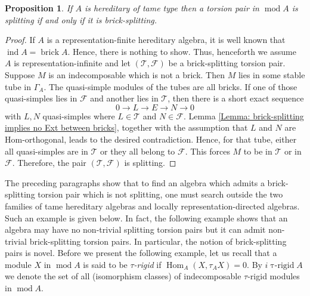 \documentclass{amsart}
\theoremstyle{thmstyle}
\newtheorem{prop}[thm]{Proposition}
\theoremstyle{exstyle}
\theoremstyle{defstyle}
\theoremstyle{remstyle}
\theoremstyle{remstyle}
\newcommand{\Hom}{\operatorname{Hom}}
\newcommand{\taurigid}{\operatorname{\tau-rigid}}
\DeclareMathOperator*{\modu}{mod}
\DeclareMathOperator*{\ind}{ind}
\DeclareMathOperator*{\brick}{brick}
\begin{document}
\begin{prop}
    If $A$ is hereditary of tame type then a torsion pair in $\modu A$ is splitting if and only if it is brick-splitting.
\end{prop}

\begin{proof}
If $A$ is a representation-finite hereditary algebra, it is well known that $\ind A=\brick A$. Hence, there is nothing to show. 
Thus, henceforth we assume $A$ is representation-infinite and let $(\mathcal{T}, \mathcal{F})$ be a brick-splitting torsion pair. 
Suppose $M$ is an indecomposable which is not a brick. Then $M$ lies in some stable tube in $\Gamma_A$. The quasi-simple modules of the tubes are all bricks. If one of those quasi-simples lies in $\mathcal{F}$ and another lies in $\mathcal{T}$, then there is a short exact sequence
    $$0 \to L \to E \to N \to 0$$
    with $L,N$ quasi-simples where $L \in \mathcal{T}$ and $N \in \mathcal{F}$. Lemma \ref{Lemma: brick-splitting implies no Ext between bricks}, together with the assumption that $L$ and $N$ are Hom-orthogonal, leads to the desired contradiction.  
    Hence, for that tube, either all quasi-simples are in $\mathcal{T}$ or they all belong to $\mathcal{F}$. This forces $M$ to be in $\mathcal{T}$ or in $\mathcal{F}$. Therefore, the pair $(\mathcal{T}, \mathcal{F})$ is splitting.
\end{proof}

The preceding paragraphs show that to find an algebra which admits a brick-splitting torsion pair which is not splitting, one must search outside the two families of tame hereditary algebras and locally representation-directed algebras. Such an example is given below. 
In fact, the following example shows that an algebra may have no non-trivial splitting torsion pairs but it can admit non-trivial brick-splitting torsion pairs. In particular, the notion of brick-splitting pairs is novel. Before we present the following example, let us recall that a module $X$ in $\modu A$ is said to be \emph{$\tau$-rigid} if $\Hom_A(X,\tau_A X)=0$. By $\textit{i}\taurigid A$ we denote the set of all (isomorphism classes) of indecomposable $\tau$-rigid modules in $\modu A$.
\end{document}
